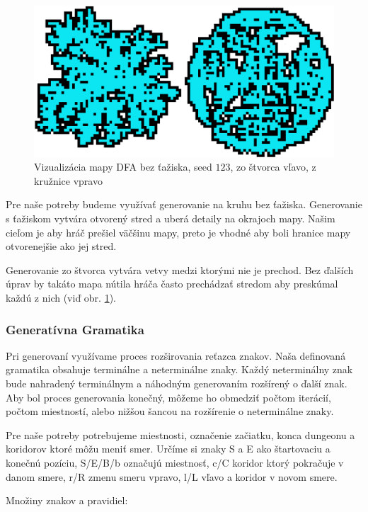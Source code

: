 \begin{figure} [H]
    \centering
    \includegraphics[width=0.6\linewidth]{obrazky-figures/dfa.png}
    \caption{Vizualizácia mapy DFA bez ťažiska, seed $123$, zo štvorca vľavo, z kružnice vpravo}
    \label{fig:dfa}
\end{figure}

Pre naše potreby budeme využívať generovanie na kruhu bez ťažiska. Generovanie s ťažiskom vytvára otvorený stred a uberá detaily na okrajoch mapy. Našim cieľom je aby hráč prešiel väčšinu mapy, preto je vhodné aby boli hranice mapy otvorenejšie ako jej stred. 

Generovanie zo štvorca vytvára vetvy medzi ktorými nie je prechod. Bez ďalších úprav by takáto mapa nútila hráča často prechádzať stredom aby preskúmal každú z nich (viď obr. \ref{fig:dfa}).

\subsubsection*{Generatívna Gramatika}

Pri generovaní využívame proces rozširovania reťazca znakov. Naša definovaná gramatika obsahuje terminálne a neterminálne znaky. Každý neterminálny znak bude nahradený terminálnym a náhodným generovaním rozšírený o ďalší znak. Aby bol proces generovania konečný, môžeme ho obmedziť počtom iterácií, počtom miestností, alebo nižšou šancou na rozšírenie o neterminálne znaky. 

Pre naše potreby potrebujeme miestnosti, označenie začiatku, konca dungeonu a koridorov ktoré môžu meniť smer. Určíme si znaky S a E ako štartovaciu a konečnú pozíciu, S/E/B/b označujú miestnosť, c/C koridor ktorý pokračuje v danom smere, r/R zmenu smeru vpravo, l/L vľavo a koridor v novom smere. 

\noindent Množiny znakov a pravidiel:

